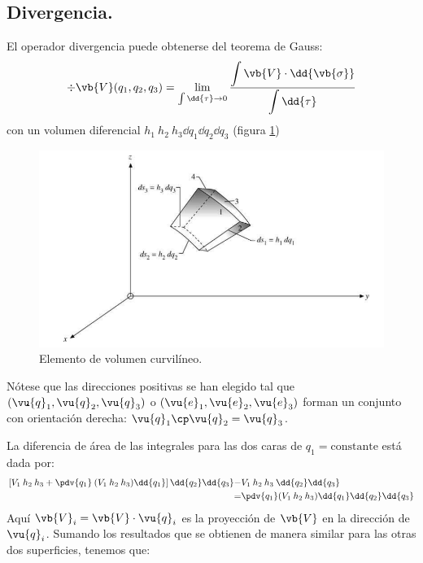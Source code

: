 \subsection{Divergencia.}
El operador divergencia puede obtenerse del teorema de Gauss:
\begin{equation}
\div{\vb{V}}(q_{1}, q_{2}, q_{3}) = \lim_{\int \dd{\tau} \to 0} \dfrac{\displaystyle \int \vb{V}\cdot \dd{\vb{\sigma}}}{\displaystyle \int \dd{\tau}}
\label{eq:ecuacion_02_19}
\end{equation}
con un volumen diferencial $h_{1} \: h_{2} \: h_{3} \dd{q_{1}} \dd{q_{2}} \dd{q_{3}}$ (figura \ref{fig:figura_001})
\begin{figure}[H]
    \centering
    \includegraphics[scale=0.5]{Imagenes/ElementoVolumen_01.png}
    \caption{Elemento de volumen curvilíneo.}
    \label{fig:figura_001}
\end{figure}
Nótese que las direcciones positivas se han elegido tal que $(\vu{q}_{1}, \vu{q}_{2}, \vu{q}_{3})$ o $(\vu{e}_{1}, \vu{e}_{2}, \vu{e}_{3})$ forman un conjunto con orientación derecha: $\vu{q}_{1} \cp \vu{q}_{2} = \vu{q}_{3}$.
\par
La diferencia de área de las integrales para las dos caras de $q_{1} = \text{constante}$ está dada por:
\begin{align}
\begin{aligned}
\left[ V_{1} \: h_{2} \: h_{3} + \pdv{q_{1}} \: (V_{1} \: h_{2} \: h_{3}) \dd{q_{1}} \right] \dd{q_{2}} \dd{q_{3}} -& V_{1} \: h_{2} \: h_{3} \: \dd{q_{2}} \dd{q_{3}} \\
=& \pdv{q_{1}} (V_{1} \: h_{2} \: h_{3}) \dd{q_{1}} \dd{q_{2}} \dd{q_{3}}
\end{aligned}
\label{eq:ecuacion_02_20}
\end{align}
Aquí  $\vb{V}_{i} = \vb{V} \cdot \vu{q}_{i}$ es la proyección de $\vb{V}$ en la dirección de $\vu{q}_{i}$. Sumando los resultados que se obtienen de manera similar para las otras dos superficies, tenemos que:
